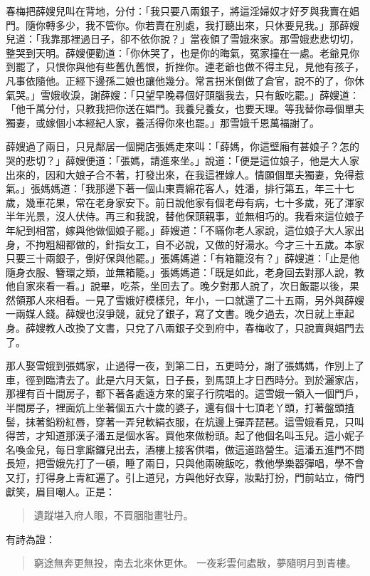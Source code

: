 春梅把薛嫂兒叫在背地，分付：「我只要八兩銀子，將這淫婦奴才好歹與我賣在娼門。隨你轉多少，我不管你。你若賣在別處，我打聽出來，只休要見我。」那薛嫂兒道：「我靠那裡過日子，卻不依你說？」當夜領了雪娥來家。那雪娥悲悲切切，整哭到天明。薛嫂便勸道：「你休哭了，也是你的晦氣，冤家撞在一處。老爺見你到罷了，只恨你與他有些舊仇舊恨，折挫你。連老爺也做不得主兒，見他有孩子，凡事依隨他。正經下邊孫二娘也讓他幾分。常言拐米倒做了倉官，說不的了，你休氣哭。」雪娥收淚，謝薛嫂：「只望早晚尋個好頭腦我去，只有飯吃罷。」薛嫂道：「他千萬分付，只教我把你送在娼門。我養兒養女，也要天理。等我替你尋個單夫獨妻，或嫁個小本經紀人家，養活得你來也罷。」那雪娥千恩萬福謝了。

薛嫂過了兩日，只見鄰居一個開店張媽走來叫：「薛媽，你這壁廂有甚娘子？怎的哭的悲切？」薛嫂便道：「張媽，請進來坐。」說道：「便是這位娘子，他是大人家出來的，因和大娘子合不著，打發出來，在我這裡嫁人。情願個單夫獨妻，免得惹氣。」張媽媽道：「我那邊下著一個山東賣綿花客人，姓潘，排行第五，年三十七歲，幾車花果，常在老身家安下。前日說他家有個老母有病，七十多歲，死了渾家半年光景，沒人伏侍。再三和我說，替他保頭親事，並無相巧的。我看來這位娘子年紀到相當，嫁與他做個娘子罷。」薛嫂道：「不瞞你老人家說，這位娘子大人家出身，不拘粗細都做的，針指女工，自不必說，又做的好湯水。今才三十五歲。本家只要三十兩銀子，倒好保與他罷。」張媽媽道：「有箱籠沒有？」薛嫂道：「止是他隨身衣服、簪環之類，並無箱籠。」張媽媽道：「既是如此，老身回去對那人說，教他自家來看一看。」說畢，吃茶，坐回去了。晚夕對那人說了，次日飯罷以後，果然領那人來相看。一見了雪娥好模樣兒，年小，一口就還了二十五兩，另外與薛嫂一兩媒人錢。薛嫂也沒爭競，就兌了銀子，寫了文書。晚夕過去，次日就上車起身。薛嫂教人改換了文書，只兌了八兩銀子交到府中，春梅收了，只說賣與娼門去了。

那人娶雪娥到張媽家，止過得一夜，到第二日，五更時分，謝了張媽媽，作別上了車，徑到臨清去了。此是六月天氣，日子長，到馬頭上才日西時分。到於灑家店，那裡有百十間房子，都下著各處遠方來的窠子行院唱的。這雪娥一領入一個門戶，半間房子，裡面炕上坐著個五六十歲的婆子，還有個十七頂老丫頭，打著盤頭揸髻，抹著鉛粉紅唇，穿著一弄兒軟絹衣服，在炕邊上彈弄琵琶。這雪娥看見，只叫得苦，才知道那漢子潘五是個水客。買他來做粉頭。起了他個名叫玉兒。這小妮子名喚金兒，每日拿廝鑼兒出去，酒樓上接客供唱，做這道路營生。這潘五進門不問長短，把雪娥先打了一頓，睡了兩日，只與他兩碗飯吃，教他學樂器彈唱，學不會又打，打得身上青紅遍了。引上道兒，方與他好衣穿，妝點打扮，門前站立，倚門獻笑，眉目嘲人。正是：
\begin{quote}
遺蹤堪入府人眼，不買胭脂畫牡丹。
\end{quote}
有詩為證：
\begin{quote}
窮途無奔更無投，南去北來休更休。
一夜彩雲何處散，夢隨明月到青樓。
\end{quote}

